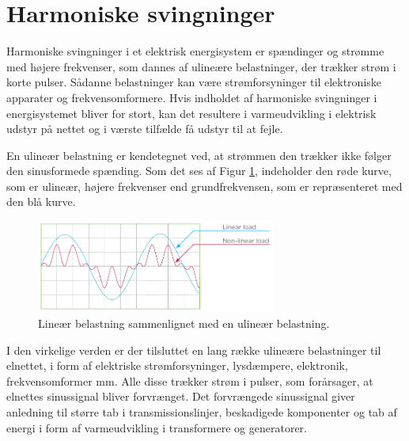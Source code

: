 
\section{Harmoniske svingninger}
\label{sec:THD}
Harmoniske svingninger i et elektrisk energisystem er spændinger og strømme med højere frekvenser, som dannes af ulineære belastninger, der trækker strøm i korte pulser. Sådanne belastninger kan være strømforsyninger til elektroniske apparater og frekvensomformere. Hvis indholdet af harmoniske svingninger i energisystemet bliver for stort, kan det resultere i varmeudvikling i elektrisk udstyr på nettet og i værste tilfælde få udstyr til at fejle. \newline

En ulineær belastning er kendetegnet ved, at strømmen den trækker ikke følger den sinusformede spænding.  Som det ses af Figur \ref{fig:nonLinear}, indeholder den røde kurve, som er ulineær, højere frekvenser end grundfrekvensen, som er repræsenteret med den blå kurve. 


\begin{figure}[H] %
	\centering
	\includegraphics[width=0.7\textwidth]{figure/nonLinear}
	\caption{Lineær belastning sammenlignet med en ulineær belastning.}
	\label{fig:nonLinear}
\end{figure}

I den virkelige verden er der tilsluttet en lang række ulineære belastninger til elnettet, i form af elektriske strømforsyninger, lysdæmpere, elektronik, frekvensomformer mm. Alle disse trækker strøm i pulser, som forårsager, at elnettes sinussignal bliver forvrænget. Det forvrængede sinussignal giver anledning til større tab i transmissionslinjer, beskadigede komponenter og tab af energi i form af varmeudvikling i transformere og generatorer. \newline


